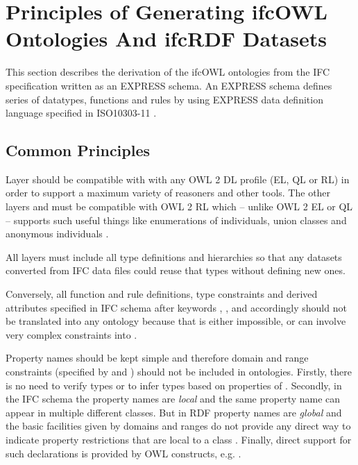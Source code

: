 
\section{Principles of Generating ifcOWL Ontologies And ifcRDF Datasets}
\label{sec:ifcOWL}
This section describes the derivation of the ifcOWL ontologies from the IFC specification written as an EXPRESS schema. An EXPRESS schema defines series of data\-types, functions and rules by using EXPRESS data definition language specified in ISO10303-11 \cite{noauthor:ifc-guide}.

\subsection{Common Principles}

Layer \ifcsimple{} should be compatible with with any OWL 2 DL profile (EL, QL or RL) in order to support a maximum variety of reasoners and other tools. The other layers \standard{} and \extended{} must be compatible with OWL 2 RL which -- unlike OWL 2 EL or QL -- supports such useful things like enumerations of individuals, union classes and anonymous individuals \cite{motik2013owl}.

All \ifcowl{} layers must include all type definitions and hierarchies so that any \ifcrdf{} datasets converted from IFC data files could reuse that types without defining new ones.

Conversely, all function and rule definitions, type constraints and derived attributes specified in IFC schema after keywords , ,  and  accordingly should not be translated into any \ifcowl{} ontology because that is either impossible, or can involve very complex constraints into \ifcowl{}.

Property names should be kept simple and therefore domain and range constraints (specified by  and ) should not be included in \ifcowl{} ontologies. Firstly, there is no need to verify types or to infer types based on properties of \ifcowl{}. Secondly, in the IFC schema the property names are \emph{local} and the same property name can appear in multiple 
different classes. But in RDF property names are \emph{global} and the basic facilities given by domains and ranges do not provide any direct way to indicate property restrictions that are local to a class \cite{world2014rdf}. Finally, direct support for such declarations is provided by OWL constructs, e.g. .

